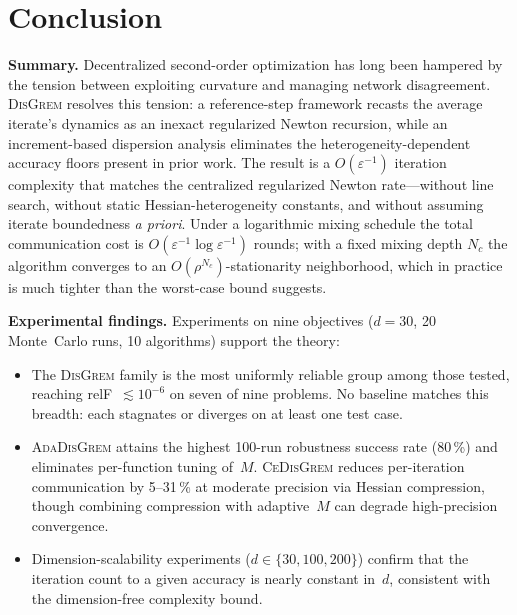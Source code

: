 \documentclass[11pt,a4paper]{article}
\def\cO{O}%
\newcommand{\cO}{\mathcal{O}}
\begin{document}
	
\section{Conclusion}
	
	\noindent\textbf{Summary.}
	Decentralized second-order optimization has long been
	hampered by the tension between exploiting curvature and
	managing network disagreement.
	\textsc{DisGrem} resolves this tension: a reference-step
	framework recasts the average iterate's dynamics as an inexact
	regularized Newton recursion, while an increment-based
	dispersion analysis eliminates the heterogeneity-dependent
	accuracy floors present in prior work.
	The result is a $\cO(\varepsilon^{-1})$ iteration complexity
	that matches the centralized regularized Newton rate---without
	line search, without static Hessian-heterogeneity constants,
	and without assuming iterate boundedness \emph{a priori}.
	Under a logarithmic mixing schedule the total communication
	cost is $\cO(\varepsilon^{-1}\log\varepsilon^{-1})$ rounds;
	with a fixed mixing depth $N_c$ the algorithm converges to an
	$\cO(\rho^{N_c})$-stationarity neighborhood, which in practice
	is much tighter than the worst-case bound suggests.
	
	\noindent\textbf{Experimental findings.}
	Experiments on nine objectives ($d{=}30$, 20 Monte~Carlo runs,
	10 algorithms) support the theory:
	\begin{itemize}[leftmargin=1.2em,itemsep=2pt]
		\item The \textsc{DisGrem} family is the most uniformly reliable
		group among those tested, reaching relF~$\lesssim 10^{-6}$ on seven of
		nine problems. No baseline matches this breadth: each stagnates or
		diverges on at least one test case.
		\item \textsc{AdaDisGrem} attains the highest 100-run robustness
		success rate (80\,\%) and eliminates per-function tuning of~$M$.
		\textsc{CeDisGrem} reduces per-iteration communication by 5--31\,\%
		at moderate precision via Hessian compression, though combining
		compression with adaptive~$M$ can degrade high-precision convergence.
		\item Dimension-scalability experiments ($d\in\{30,100,200\}$)
		confirm that the iteration count to a given accuracy is nearly
		constant in~$d$, consistent with the dimension-free complexity bound.
	\end{itemize}
	
\end{document}

